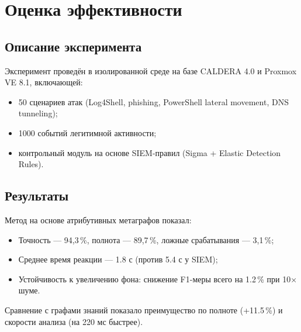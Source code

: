 \section{Оценка эффективности}

\subsection{Описание эксперимента}

Эксперимент проведён в изолированной среде на базе CALDERA 4.0 и Proxmox VE 8.1, включающей:
\begin{itemize}
    \item 50 сценариев атак (Log4Shell, phishing, PowerShell lateral movement, DNS tunneling);
    \item 1000 событий легитимной активности;
    \item контрольный модуль на основе SIEM-правил (Sigma + Elastic Detection Rules).
\end{itemize}

\subsection{Результаты}

Метод на основе атрибутивных метаграфов показал:
\begin{itemize}
    \item Точность — 94,3\,\%, полнота — 89,7\,\%, ложные срабатывания — 3,1\,\%;
    \item Среднее время реакции — 1.8 с (против 5.4 с у SIEM);
    \item Устойчивость к увеличению фона: снижение F1-меры всего на 1.2\,\% при 10× шуме.
\end{itemize}

Сравнение с графами знаний \cite{li2022kg} показало преимущество по полноте (+11.5\,\%) и скорости анализа (на 220 мс быстрее).